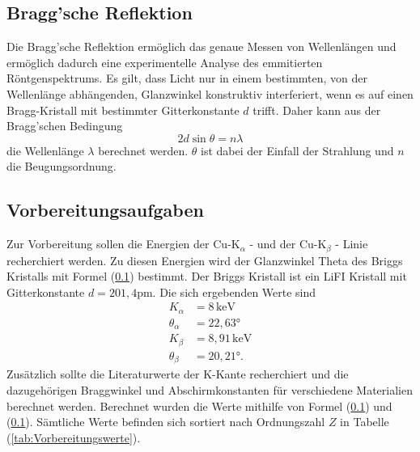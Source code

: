\subsection{Bragg'sche Reflektion}
Die Bragg'sche Reflektion ermöglich das genaue Messen von Wellenlängen und ermöglich dadurch eine experimentelle Analyse des emmitierten Röntgenspektrums. Es gilt, 
dass Licht nur in einem bestimmten, von der Wellenlänge abhängenden, Glanzwinkel konstruktiv interferiert, wenn es auf einen Bragg-Kristall mit bestimmter Gitterkonstante
$d$ trifft. Daher kann aus der Bragg'schen Bedingung 
\begin{equation}
    \label{eqn:Bragg_Bedingung}
    2 d \sin{\theta} = n \lambda
\end{equation}
die Wellenlänge $\lambda$ berechnet werden. $\theta$ ist dabei der Einfall der Strahlung und $n$ die Beugungsordnung.

\subsection{Vorbereitungsaufgaben}
\label{sec:Vorbereitungsaufgaben}
Zur Vorbereitung sollen die Energien der $\text{Cu-K}_\alpha$ - und der $\text{Cu-K}_{\beta}$ - Linie recherchiert werden. Zu diesen Energien wird der Glanzwinkel 
Theta des Briggs Kristalls mit Formel (\ref{}) bestimmt. Der Briggs Kristall ist ein LiFI Kristall mit Gitterkonstante $d = 201,4 \unit{\pico\meter}$.
Die sich ergebenden Werte sind 
\begin{align*}
    K_\alpha &= 8 \, \si{\kilo\electronvolt}\\
    \theta_\alpha &= 22,63 \unit{\degree} \\
    K_\beta &= 8,91 \, \si{\kilo\electronvolt}\\
    \theta_\beta &= 20,21 \unit{\degree} .
\end{align*}
Zusätzlich sollte die Literaturwerte der K-Kante recherchiert und die dazugehörigen Braggwinkel und Abschirmkonstanten für verschiedene Materialien berechnet werden.
Berechnet wurden die Werte mithilfe von Formel (\ref{}) und (\ref{}).
Sämtliche Werte befinden sich sortiert nach Ordnungszahl $Z$ in Tabelle (\ref{tab:Vorbereitungswerte}).

